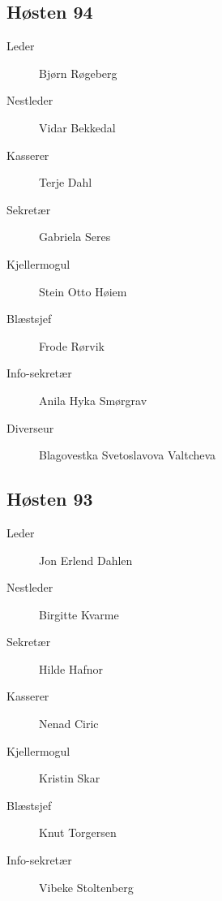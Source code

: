 {\begin{minipage}{0.6\textwidth}
\subsection*{Høsten 94}

\begin{description}
	\item[Leder] Bjørn Røgeberg
	\item[Nestleder] Vidar Bekkedal
	\item[Kasserer] Terje Dahl
	\item[Sekretær] Gabriela Seres
	\item[Kjellermogul] Stein Otto Høiem
	\item[Blæstsjef] Frode Rørvik
	\item[Info-sekretær] Anila Hyka Smørgrav
	\item[Diverseur] Blagovestka Svetoslavova Valtcheva
\end{description}
\subsection*{Høsten 93}

\begin{description}
	\item[Leder] Jon Erlend Dahlen
	\item[Nestleder] Birgitte Kvarme
	\item[Sekretær] Hilde Hafnor
	\item[Kasserer] Nenad Ciric
	\item[Kjellermogul] Kristin Skar
	\item[Blæstsjef] Knut Torgersen
	\item[Info-sekretær] Vibeke Stoltenberg
\end{description}
\end{minipage}
}


